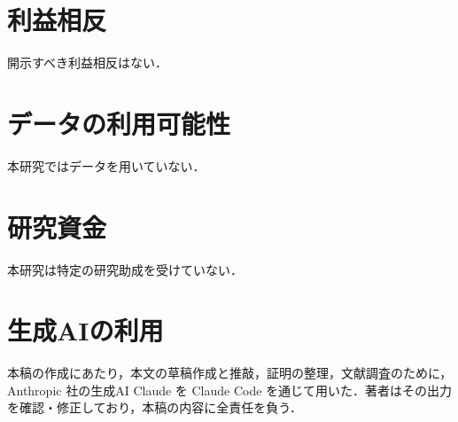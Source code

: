 \documentclass[11pt,a4paper]{ltjsarticle}
\theoremstyle{plain}
\theoremstyle{definition}
\theoremstyle{remark}
\begin{document}
\section*{利益相反}
開示すべき利益相反はない．

\section*{データの利用可能性}
本研究ではデータを用いていない．

\section*{研究資金}
本研究は特定の研究助成を受けていない．

\section*{生成AIの利用}
本稿の作成にあたり，本文の草稿作成と推敲，証明の整理，文献調査のために，Anthropic 社の生成AI Claude を Claude Code を通じて用いた．著者はその出力を確認・修正しており，本稿の内容に全責任を負う．
\end{document}

